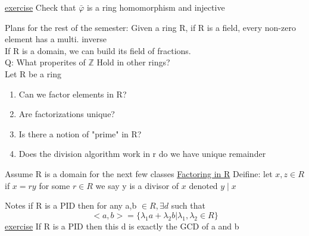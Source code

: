 \documentclass{article}
\begin{document}
\underline{exercise}
Check that $\bar{\varphi} $ is a ring homomorphism and injective 


Plans for the rest of the semester: Given a ring R, if R is a field, every non-zero element has a multi. inverse \\ 
If R is a domain, we can build its field of fractions. 
\\ 
Q: What properites of $\mathbb{Z}$ Hold in other rings? 
\\ 
Let R be a ring \begin{enumerate}
    \item Can we factor elements in R? 
    \item Are factorizations unique? 
    \item Is there a notion of "prime" in R? 
    \item Does the division algorithm work in r do we have unique remainder
    
\end{enumerate}


Assume R is a domain for the next few classes
\underline{Factoring in R} 
Deifine: let $x, z \in R$ if $x = ry$ for some $r \in R$ we say y is a divisor of $x$  denoted $y \mid x$

 
Notes if R is a PID then for any a,b $\in R, \exists d$  such that $$<a, b> = \{\lambda_1 a + \lambda_2 b | \lambda_1, \lambda_2 \in R \}$$
\underline{exercise} If R is a PID then this d is exactly the GCD of a and b
\end{document}
